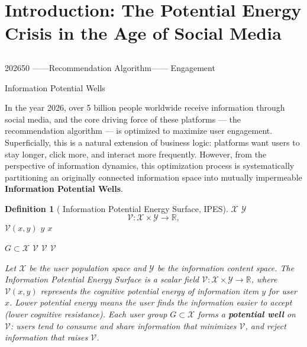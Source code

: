 \documentclass[11pt,a4paper]{article}
\newtheorem{definition}[theorem]{Definition}
\theoremstyle{remark}
\newcommand{\R}{\mathbb{R}}
\newcommand{\Y}{\mathcal{Y}}
\newcommand{\X}{\mathcal{X}}
\newcommand{\InfoPE}{\mathcal{V}}
\begin{document}
\section{}
\section{Introduction: The Potential Energy Crisis in the Age of Social Media}

\subsection{}


202650
——Recommendation Algorithm——
Engagement


\textbf{}Information Potential Wells

In the year 2026, over 5 billion people worldwide receive information through social media,
and the core driving force of these platforms --- the recommendation algorithm --- is
optimized to maximize user engagement. Superficially, this is a natural extension of
business logic: platforms want users to stay longer, click more, and interact more
frequently. However, from the perspective of information dynamics, this optimization
process is systematically partitioning an originally connected information space into
mutually impermeable \textbf{Information Potential Wells}.

\begin{definition}[ Information Potential Energy Surface, IPES]
\label{def:ipes}
 $\X$ $\Y$ 
\[
\InfoPE: \X \times \Y \to \R,
\]
 $\InfoPE(x, y)$  $y$  $x$ 

 $G \subset \X$  $\InfoPE$ \textbf{}
 $\InfoPE$  $\InfoPE$ 

Let $\X$ be the user population space and $\Y$ be the information content space.
The Information Potential Energy Surface is a scalar field
$\InfoPE: \X \times \Y \to \R$,
where $\InfoPE(x, y)$ represents the cognitive potential energy of information item $y$
for user $x$. Lower potential energy means the user finds the information easier to
accept (lower cognitive resistance). Each user group $G \subset \X$ forms a
\textbf{potential well} on $\InfoPE$: users tend to consume and share information that
minimizes $\InfoPE$, and reject information that raises $\InfoPE$.
\end{definition}
\end{document}
